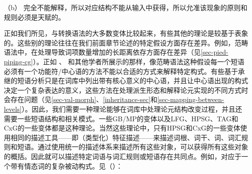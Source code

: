 \zl

（b） 完全不能解释，所以对应结构不能从输入中获得，所以允准该现象的原则和规则必须是天赋的。

正如我们所见，与转换语法的大多数变体比较起来，有些其他的理论是较基于表象的。这些别的理论往往在我们前面章节论述的特定假设方面存在差异。例如，范畴语法中，在处理导致词项数量增加的长距离依存方面存在差异（见\ref{sec-pied-piping-cg}）。正如 \citet{Jacobs2008a}、 \citet{Jackendoff2008a}和其他学者所展示的那样，像范畴语法这种假设每一个短语必须有一个功能符/中心语的方法不能以合适的方式来解释特定构式。有些基于承继的短语分析只是在词库中列出带有核心意义的中心语，并且让中心语出现的构式决定一个复杂表达的意义，这些方法在处理派生形态和解释论元实现的不同方式时会存在问题（见\ref{sec-val-morph}、\ref{inheritance-sec}和\ref{sec-mapping-between-levels}）。因此，我们需要一种理论能够在词库中处理论元结构改变过程，并且还需要一些短语结构和相关模式。一些GB/MP的变体以及LFG、HPSG、TAG和CxG的一些变体都是这种理论。当然这些理论中，只有HPSG和CxG的一些变体使用相同的描述工具——即（类型化）特征描述——来描述词根、词干、词、词汇规则和短语。通过使用统一的描述体系来描述所有这些对象，可以获得所有这些对象的概括。因此就可以描述特定词语与词汇规则或短语存在共同点。例如，\bard{}对应于一个带有情态词的复杂被动构式。见（）：
